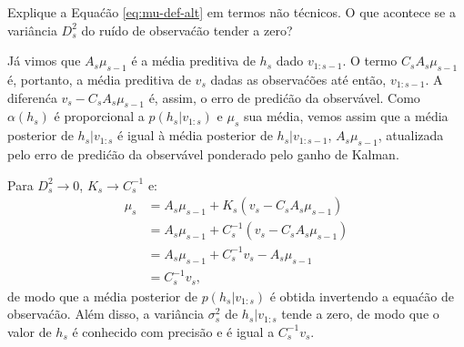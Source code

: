\begin{exenumerate}
\begin{solution}
        
    \end{solution}
    
    \item Explique a Equa\'c\~ao \eqref{eq:mu-def-alt} em termos n\~ao t\'ecnicos. O que acontece se a vari\^ancia $D_s^2$ do ru\'ido de observa\'c\~ao tender a zero?
    
    \begin{solution}
        J\'a vimos que $A_s \mu_{s-1}$ \'e a m\'edia preditiva de $h_s$ dado $v_{1:s-1}$. O termo $C_s A_s \mu_{s-1}$
        \'e, portanto, a m\'edia preditiva de $v_s$ dadas as observa\'c\~oes at\'e
        ent\~ao, $v_{1:s-1}$. A diferen\'ca $v_s - C_s A_s \mu_{s-1}$ \'e,
        assim, o erro de predi\'c\~ao da observ\'avel. Como $\alpha(h_s)$ \'e
        proporcional a $p(h_s | v_{1:s})$ e $\mu_s$ sua m\'edia,
        vemos assim que a m\'edia posterior de $h_s | v_{1:s}$ \'e igual \`a
        m\'edia posterior de $h_s | v_{1:s-1}$, $A_s \mu_{s-1}$, atualizada
        pelo erro de predi\'c\~ao da observ\'avel ponderado pelo
        ganho de Kalman.
        
        Para $D_s^2 \to 0$, $K_s \to C_s^{-1}$ e:
        \begin{align}
            \mu_s & = A_s \mu_{s-1} + K_s \left(v_s - C_s A_s \mu_{s-1}\right) \\
            & = A_s \mu_{s-1} + C_s^{-1} \left(v_s - C_s A_s \mu_{s-1}\right) \\
            & = A_s \mu_{s-1} + C_s^{-1} v_s - A_s \mu_{s-1}\\
            & =  C_s^{-1} v_s,
        \end{align}
        de modo que a m\'edia posterior de $p(h_s | v_{1:s})$ \'e obtida
        invertendo a equa\'c\~ao de observa\'c\~ao. Al\'em disso, a vari\^ancia
        $\sigma_s^2$ de $h_s | v_{1:s}$ tende a zero, de modo que o valor
        de $h_s$ \'e conhecido com precis\~ao e \'e igual a $C_s^{-1} v_s$.
        
    \end{solution}
\end{exenumerate}